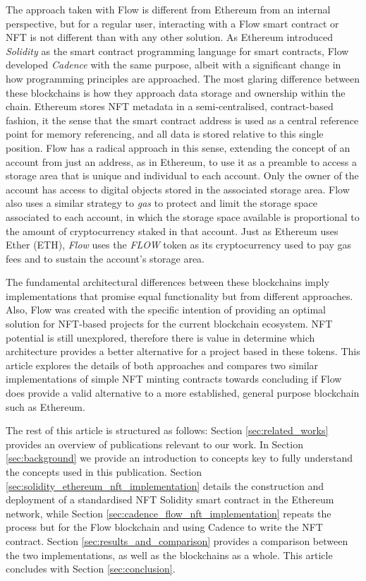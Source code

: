 \documentclass[../main.tex]{subfiles}
\begin{document}
The approach taken with Flow is different from Ethereum from an internal perspective, but for a regular user, interacting with a Flow smart contract or NFT is not different than with any other solution. As Ethereum introduced \textit{Solidity} as the smart contract programming language for smart contracts, Flow developed \textit{Cadence} with the same purpose, albeit with a significant change in how programming principles are approached. The most glaring difference between these blockchains is how they approach data storage and ownership within the chain. Ethereum stores NFT metadata in a semi-centralised, contract-based fashion, it the sense that the smart contract address is used as a central reference point for memory referencing, and all data is stored relative to this single position. Flow has a radical approach in this sense, extending the concept of an account from just an address, as in Ethereum, to use it as a preamble to access a storage area that is unique and individual to each account. Only the owner of the account has access to digital objects stored in the associated storage area. Flow also uses a similar strategy to \textit{gas} to protect and limit the storage space associated to each account, in which the storage space available is proportional to the amount of cryptocurrency staked in that account. Just as Ethereum uses Ether (ETH), \textit{Flow} uses the \textit{FLOW} token as its cryptocurrency used to pay gas fees and to sustain the account's storage area.
\par
The fundamental architectural differences between these blockchains imply implementations that promise equal functionality but from different approaches. Also, Flow was created with the specific intention of providing an optimal solution for NFT-based projects for the current blockchain ecosystem. NFT potential is still unexplored, therefore there is value in determine which architecture provides a better alternative for a project based in these tokens. This article explores the details of both approaches and compares two similar implementations of simple NFT minting contracts towards concluding if Flow does provide a valid alternative to a more established, general purpose blockchain such as Ethereum.
\par
The rest of this article is structured as follows: Section \ref{sec:related_works} provides an overview of publications relevant to our work. In Section \ref{sec:background} we provide an introduction to concepts key to fully understand the concepts used in this publication. Section \ref{sec:solidity_ethereum_nft_implementation} details the construction and deployment of a standardised NFT Solidity smart contract in the Ethereum network, while Section \ref{sec:cadence_flow_nft_implementation} repeats the process but for the Flow blockchain and using Cadence to write the NFT contract. Section \ref{sec:results_and_comparison} provides a comparison between the two implementations, as well as the blockchains as a whole. This article concludes with Section \ref{sec:conclusion}.
\end{document}

